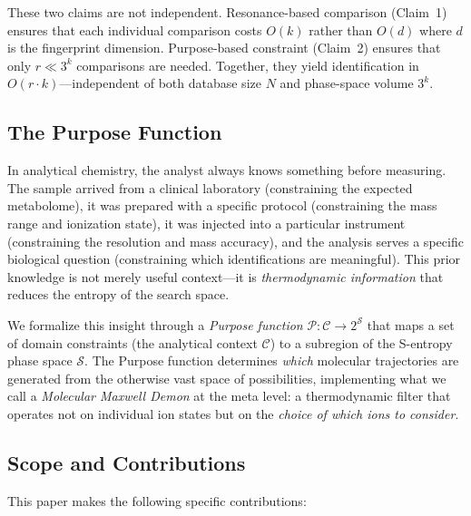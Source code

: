 \documentclass[11pt,twocolumn,a4paper]{article}
\theoremstyle{definition}
\theoremstyle{remark}
\newcommand{\Sspace}{\mathcal{S}}
\newcommand{\Purpose}{\mathcal{P}}
\newcommand{\Context}{\mathcal{C}}
\begin{document}
These two claims are not independent. Resonance-based comparison (Claim~1) ensures that each individual comparison costs $O(k)$ rather than $O(d)$ where $d$ is the fingerprint dimension. Purpose-based constraint (Claim~2) ensures that only $r \ll 3^k$ comparisons are needed. Together, they yield identification in $O(r \cdot k)$---independent of both database size $N$ and phase-space volume $3^k$.

\subsection{The Purpose Function}\label{sec:purpose-intro}

In analytical chemistry, the analyst always knows something before measuring. The sample arrived from a clinical laboratory (constraining the expected metabolome), it was prepared with a specific protocol (constraining the mass range and ionization state), it was injected into a particular instrument (constraining the resolution and mass accuracy), and the analysis serves a specific biological question (constraining which identifications are meaningful). This prior knowledge is not merely useful context---it is \emph{thermodynamic information} that reduces the entropy of the search space.

We formalize this insight through a \emph{Purpose function} $\Purpose\colon \Context \to 2^{\Sspace}$ that maps a set of domain constraints (the analytical context $\Context$) to a subregion of the S-entropy phase space $\Sspace$. The Purpose function determines \emph{which} molecular trajectories are generated from the otherwise vast space of possibilities, implementing what we call a \emph{Molecular Maxwell Demon} at the meta level: a thermodynamic filter that operates not on individual ion states but on the \emph{choice of which ions to consider}.

\subsection{Scope and Contributions}\label{sec:contributions}

This paper makes the following specific contributions:
\end{document}

